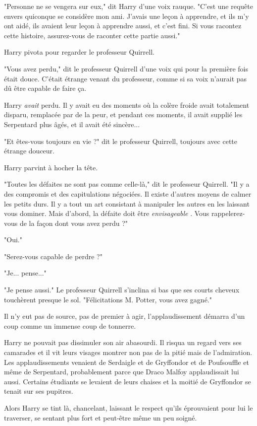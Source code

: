 "Personne ne se vengera sur eux," dit Harry d'une voix rauque. "C'est une requête envers quiconque se considère mon ami. J'avais une leçon à apprendre, et ils m'y ont aidé, ils avaient leur leçon à apprendre aussi, et c'est fini. Si vous racontez cette histoire, assurez-vous de raconter cette partie aussi."

Harry pivota pour regarder le professeur Quirrell.

"Vous avez perdu," dit le professeur Quirrell d'une voix qui pour la première fois était douce. C'était étrange venant du professeur, comme si sa voix n'aurait pas dû être capable de faire ça.

Harry \emph{avait}  perdu. Il y avait eu des moments où la colère froide avait totalement disparu, remplacée par de la peur, et pendant ces moments, il avait supplié les Serpentard plus âgés, et il avait été sincère...

"Et êtes-vous toujours en vie ?" dit le professeur Quirrell, toujours avec cette étrange douceur.

Harry parvint à hocher la tête.

"Toutes les défaites ne sont pas comme celle-là," dit le professeur Quirrell. "Il y a des compromis et des capitulations négociées. Il existe d'autres moyens de calmer les petits durs. Il y a tout un art consistant à manipuler les autres en les laissant vous dominer. Mais d'abord, la défaite doit être \emph{envisageable} . Vous rappelerez-vous de la façon dont vous avez perdu ?"

"Oui."

"Serez-vous capable de perdre ?"

"Je... pense..."

"Je pense aussi." Le professeur Quirrell s'inclina si bas que ses courts cheveux touchèrent presque le sol. "Félicitations M. Potter, vous avez gagné."

Il n'y eut pas de source, pas de premier à agir, l'applaudissement démarra d'un coup comme un immense coup de tonnerre.

Harry ne pouvait pas dissimuler son air abasourdi. Il risqua un regard vers ses camarades et il vit leurs visages montrer non pas de la pitié mais de l'admiration. Les applaudissements venaient de Serdaigle et de Gryffondor et de Poufsouffle et même de Serpentard, probablement parce que Draco Malfoy applaudissait lui aussi. Certains étudiants se levaient de leurs chaises et la moitié de Gryffondor se tenait sur ses pupitres.

Alors Harry se tint là, chancelant, laissant le respect qu'ils éprouvaient pour lui le traverser, se sentant plus fort et peut-être même un peu soigné.

